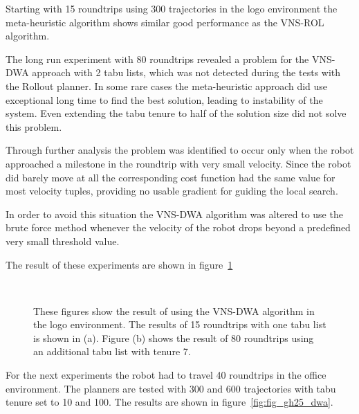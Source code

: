 Starting with 15 roundtrips using 300 trajectories in the logo environment the meta-heuristic algorithm shows similar good performance as the  VNS-ROL algorithm. 

The long run experiment with 80 roundtrips revealed a problem for the VNS-DWA approach with 2 tabu lists, which was not detected during the tests with the Rollout planner.
In some rare cases the meta-heuristic approach did use exceptional long time to find the best solution, leading to instability of the system.
Even extending the tabu tenure to half of the solution size did not solve this problem.

Through further analysis the problem was identified to occur only when the robot approached a milestone in the roundtrip with very small velocity.
Since the robot did barely move at all the corresponding cost function had the same value for most velocity tuples, providing no usable gradient for guiding the local search. 

In order to avoid this situation the VNS-DWA algorithm was altered to use the brute force method whenever the velocity of the robot drops beyond a predefined very small threshold value.

The result of these experiments are shown in figure~\ref{fig:fig_logo_dwa}
\begin{figure}[thpb]
   \myfloatalign
    \tiny
    \centering
    \\
    {
    \captionsetup[subfigure]{labelformat=empty} 
    }

    \caption[Experiment: VNS-DWA logo]{These figures show the result of using the VNS-DWA algorithm in the logo environment.
    The results of 15 roundtrips with one tabu list is shown in (a).  Figure (b) shows the result of 80 roundtrips using an additional tabu list with tenure 7.}  
     \label{fig:fig_logo_dwa}
\end{figure} 


For the next experiments the robot had to travel 40 roundtrips in the office environment. 
The planners are tested with 300 and 600 trajectories with tabu tenure set to 10 and 100.
The results are shown in figure~\ref{fig:fig_gh25_dwa}.
 
